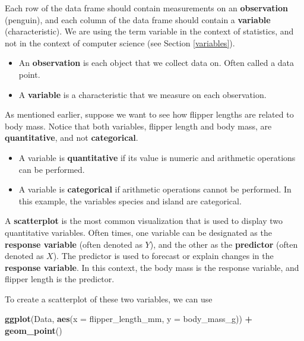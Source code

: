 \documentclass[
]{book}
\newenvironment{Shaded}{\begin{snugshade}}{\end{snugshade}}
\newcommand{\AttributeTok}[1]{\textcolor[rgb]{0.13,0.29,0.53}{#1}}
\newcommand{\FunctionTok}[1]{\textcolor[rgb]{0.13,0.29,0.53}{\textbf{#1}}}
\newcommand{\NormalTok}[1]{#1}
\newcommand{\SpecialCharTok}[1]{\textcolor[rgb]{0.81,0.36,0.00}{\textbf{#1}}}
\providecommand{\tightlist}{%
  \setlength{\itemsep}{0pt}\setlength{\parskip}{0pt}}
\theoremstyle{definition}
\theoremstyle{definition}
\theoremstyle{definition}
\theoremstyle{definition}
\theoremstyle{remark}
\begin{document}
Each row of the data frame should contain measurements on an \textbf{observation} (penguin), and each column of the data frame should contain a \textbf{variable} (characteristic). We are using the term variable in the context of statistics, and not in the context of computer science (see Section \ref{variables}).

\begin{itemize}
\tightlist
\item
  An \textbf{observation} is each object that we collect data on. Often called a data point.
\item
  A \textbf{variable} is a characteristic that we measure on each observation.
\end{itemize}

As mentioned earlier, suppose we want to see how flipper lengths are related to body mass. Notice that both variables, flipper length and body mass, are \textbf{quantitative}, and not \textbf{categorical}.

\begin{itemize}
\tightlist
\item
  A variable is \textbf{quantitative} if its value is numeric and arithmetic operations can be performed.
\item
  A variable is \textbf{categorical} if arithmetic operations cannot be performed. In this example, the variables species and island are categorical.
\end{itemize}

A \textbf{scatterplot} is the most common visualization that is used to display two quantitative variables. Often times, one variable can be designated as the \textbf{response variable} (often denoted as \(Y\)), and the other as the \textbf{predictor} (often denoted as \(X\)). The predictor is used to forecast or explain changes in the \textbf{response variable}. In this context, the body mass is the response variable, and flipper length is the predictor.

To create a scatterplot of these two variables, we can use

\begin{Shaded}
\begin{Highlighting}[]
\FunctionTok{ggplot}\NormalTok{(Data, }\FunctionTok{aes}\NormalTok{(}\AttributeTok{x =}\NormalTok{ flipper\_length\_mm, }\AttributeTok{y =}\NormalTok{ body\_mass\_g)) }\SpecialCharTok{+}
  \FunctionTok{geom\_point}\NormalTok{()}
\end{Highlighting}
\end{Shaded}
\end{document}
